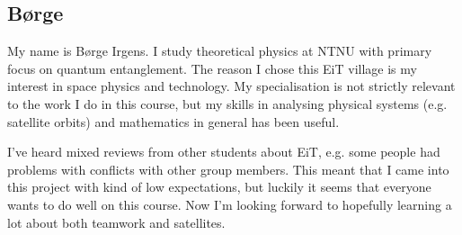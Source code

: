 \subsection{Børge}

My name is Børge Irgens. I study theoretical physics at NTNU with primary focus on quantum entanglement. The reason I chose this EiT village is my interest in space physics and technology. My specialisation is not strictly relevant to the work I do in this course, but my skills in analysing physical systems (e.g. satellite orbits) and mathematics in general has been useful.

I've heard mixed reviews from other students about EiT, e.g. some people had problems with conflicts with other group members. This meant that I came into this project with kind of low expectations, but luckily it seems that everyone wants to do well on this course. Now I'm looking forward to hopefully learning a lot about both teamwork and satellites.
